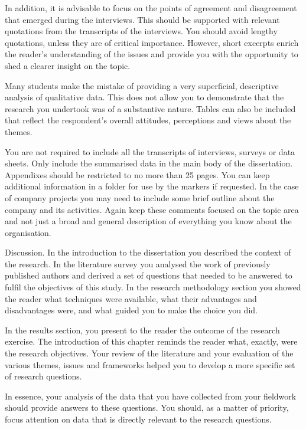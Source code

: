 			In addition, it is advisable to focus on the points of agreement and disagreement that emerged during the interviews. This should be supported with relevant quotations from the transcripts of the interviews. You should avoid lengthy quotations, unless they are of critical importance. However, short excerpts enrich the reader’s understanding of the issues and provide you with the opportunity to shed a clearer insight on the topic.
			
			Many students make the mistake of providing a very superficial, descriptive analysis of qualitative data. This does not allow you to demonstrate that the research you undertook was of a substantive nature. Tables can also be included that reflect the respondent’s overall attitudes, perceptions and views about the themes.
			
			You are not required to include all the transcripts of interviews, surveys or data sheets. Only include the summarised data in the main body of the dissertation. Appendixes should be restricted to no more than 25 pages. You can keep additional information in a folder for use by the markers if requested.
			In the case of company projects you may need to include some brief outline about the company and its activities. Again keep these comments focused on the topic area and not just a broad and general description of everything you know about the organisation.
			
			
			Discussion.
			In the introduction to the dissertation you described the context of the research. In the literature survey you analysed the work of previously published authors and derived a set of questions that needed to be answered to fulfil the objectives of this study. In the research methodology section you showed the reader what techniques were available, what their advantages and disadvantages were, and what guided you to make the choice you did. 
			
			In the results section, you present to the reader the outcome of the research exercise.
			The introduction of this chapter reminds the reader what, exactly, were the research objectives. 
			Your review of the literature and your evaluation of the various themes, issues and frameworks helped you to develop a more specific set of research questions.
			
			In essence, your analysis of the data that you have collected from your fieldwork should provide answers to these questions. You should, as a matter of priority, focus attention on data that is directly relevant to the research questions. 
			
